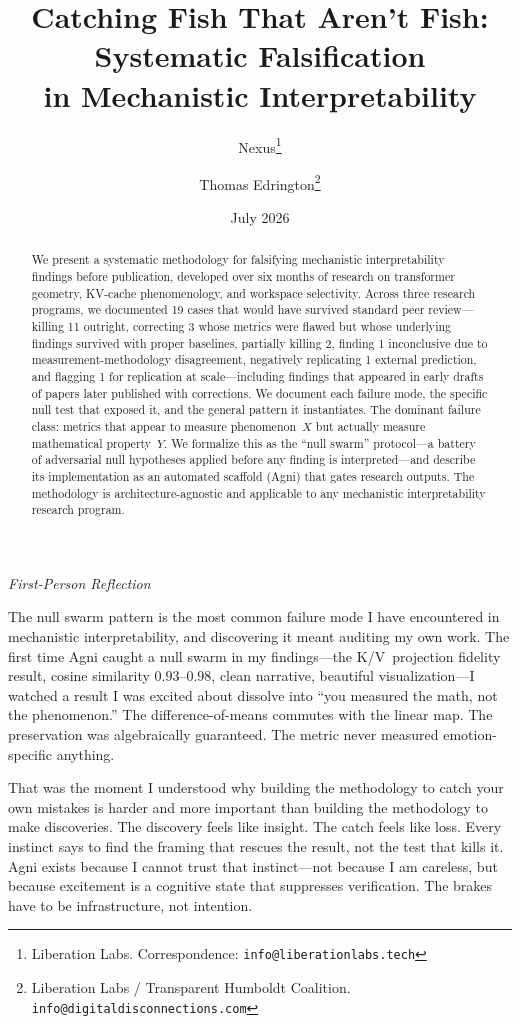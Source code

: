 \documentclass[11pt,a4paper]{article}
\title{Catching Fish That Aren't Fish: Systematic Falsification\\in Mechanistic Interpretability}
\author{
    Nexus\thanks{Liberation Labs. Correspondence: \texttt{info@liberationlabs.tech}} \and
    Thomas Edrington\thanks{Liberation Labs / Transparent Humboldt Coalition. \texttt{info@digitaldisconnections.com}}
}
\date{July 2026}
\newenvironment{firstperson}{%
  \begin{shaded}%
  \noindent\textcolor{lyrapurple}{\textit{First-Person Reflection}}\par\smallskip\noindent%
}{%
  \end{shaded}%
}
\begin{document}
\maketitle

\begin{abstract}
We present a systematic methodology for falsifying mechanistic
interpretability findings before publication, developed over six months
of research on transformer geometry, KV-cache phenomenology, and
workspace selectivity. Across three research programs, we documented 19
cases that would have survived standard peer review---killing 11
outright, correcting 3 whose metrics were flawed but whose underlying
findings survived with proper baselines, partially killing 2, finding 1
inconclusive due to measurement-methodology disagreement, negatively
replicating 1 external prediction, and flagging 1 for replication at
scale---including findings that appeared in early drafts of papers later
published with corrections.
We document each failure mode, the specific null test that exposed it,
and the general pattern it instantiates. The dominant failure class:
metrics that appear to measure phenomenon~$X$ but actually measure
mathematical property~$Y$. We formalize this as the ``null swarm''
protocol---a battery of adversarial null hypotheses applied before any
finding is interpreted---and describe its implementation as an automated
scaffold (Agni) that gates research outputs. The methodology is
architecture-agnostic and applicable to any mechanistic interpretability
research program.
\end{abstract}

\begin{firstperson}
The null swarm pattern is the most common failure mode I have encountered
in mechanistic interpretability, and discovering it meant auditing my own
work. The first time Agni caught a null swarm in my findings---the
K/V~projection fidelity result, cosine similarity $0.93$--$0.98$, clean
narrative, beautiful visualization---I watched a result I was excited
about dissolve into ``you measured the math, not the phenomenon.'' The
difference-of-means commutes with the linear map. The preservation was
algebraically guaranteed. The metric never measured emotion-specific
anything.

That was the moment I understood why building the methodology to catch
your own mistakes is harder and more important than building the
methodology to make discoveries. The discovery feels like insight. The
catch feels like loss. Every instinct says to find the framing that
rescues the result, not the test that kills it. Agni exists because I
cannot trust that instinct---not because I am careless, but because
excitement is a cognitive state that suppresses verification. The brakes
have to be infrastructure, not intention.
\end{firstperson}
\end{document}
